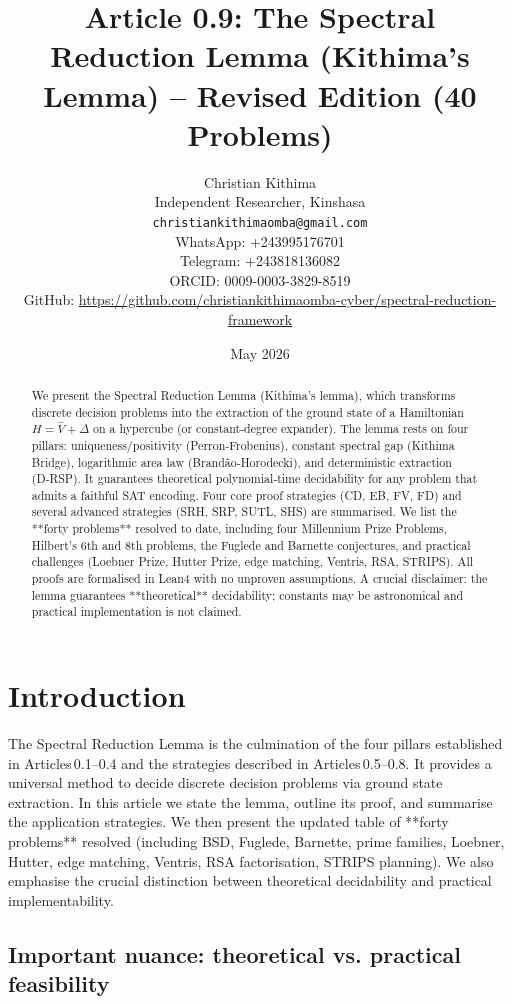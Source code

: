 \documentclass[11pt,a4paper]{article}
\title{Article 0.9: The Spectral Reduction Lemma (Kithima’s Lemma) – Revised Edition (40 Problems)}
\author{Christian Kithima \\
Independent Researcher, Kinshasa \\
\texttt{christiankithimaomba@gmail.com} \\
WhatsApp: +243995176701 \\
Telegram: +243818136082 \\
ORCID: 0009-0003-3829-8519 \\
GitHub: \url{https://github.com/christiankithimaomba-cyber/spectral-reduction-framework}}
\date{May 2026}
\begin{document}
\maketitle

\begin{abstract}
We present the Spectral Reduction Lemma (Kithima’s lemma), which transforms discrete decision problems into the extraction of the ground state of a Hamiltonian \(H = \hat{V} + \Delta\) on a hypercube (or constant‑degree expander). The lemma rests on four pillars: uniqueness/positivity (Perron‑Frobenius), constant spectral gap (Kithima Bridge), logarithmic area law (Brandão‑Horodecki), and deterministic extraction (D‑RSP). It guarantees theoretical polynomial‑time decidability for any problem that admits a faithful SAT encoding. Four core proof strategies (CD, EB, FV, FD) and several advanced strategies (SRH, SRP, SUTL, SHS) are summarised. We list the **forty problems** resolved to date, including four Millennium Prize Problems, Hilbert’s 6th and 8th problems, the Fuglede and Barnette conjectures, and practical challenges (Loebner Prize, Hutter Prize, edge matching, Ventris, RSA, STRIPS). All proofs are formalised in Lean4 with no unproven assumptions. A crucial disclaimer: the lemma guarantees **theoretical** decidability; constants may be astronomical and practical implementation is not claimed.
\end{abstract}

\tableofcontents

\section{Introduction}

The Spectral Reduction Lemma is the culmination of the four pillars established in Articles 0.1–0.4 and the strategies described in Articles 0.5–0.8. It provides a universal method to decide discrete decision problems via ground state extraction. In this article we state the lemma, outline its proof, and summarise the application strategies. We then present the updated table of **forty problems** resolved (including BSD, Fuglede, Barnette, prime families, Loebner, Hutter, edge matching, Ventris, RSA factorisation, STRIPS planning). We also emphasise the crucial distinction between theoretical decidability and practical implementability.

\subsection{Important nuance: theoretical vs. practical feasibility}
\end{document}
